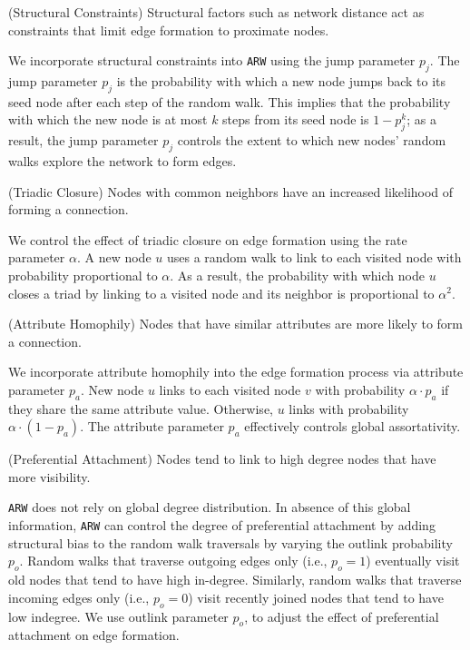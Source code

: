 \begin{ph}
	(Structural Constraints) Structural factors such as network distance
	act as constraints that limit edge formation to proximate nodes.  \cite{35626}
\end{ph}

We incorporate structural constraints into \texttt{ARW} using the jump parameter $p_j$.
The jump parameter $p_j$ is the probability with which a new node jumps back to its seed node
after each step of the random walk. This implies that the probability with which the new node
is at most $k$ steps from its seed node is $1-p^k_j$; as a result, the jump parameter $p_j$
controls the extent to which new nodes' random walks explore the network to form edges.

\begin{ph}
	(Triadic Closure) Nodes with common neighbors have an
	increased likelihood of forming a connection. \cite{simmel1950sociology}
\end{ph}

We control the effect of triadic closure on edge formation using the
rate parameter $\alpha$. A new node $u$ uses a random walk to
link to each visited node with probability proportional to $\alpha$. As a
result, the probability with which node $u$ closes a triad by linking to
a visited node and its neighbor is proportional to $\alpha^2$.

\begin{ph}
	(Attribute Homophily) Nodes that have similar attributes are more likely
	to form a connection. \cite{mcpherson2001birds}
\end{ph}
We incorporate attribute homophily into the edge formation process via attribute parameter $p_a$. New node
$u$ links to each visited node $v$ with probability $\alpha \cdot p_a$ if they share
the same attribute value. Otherwise, $u$ links with probability $\alpha \cdot (1-p_a)$.
The attribute parameter $p_a$ effectively controls global assortativity.

\begin{ph}
	(Preferential Attachment) Nodes tend to link to high degree nodes that have more
	visibility. \cite{barabasi1999emergence}
\end{ph}
\texttt{ARW} does not rely on global degree distribution. In absence of this global information, \texttt{ARW} can control the degree of preferential attachment by adding structural bias to the random walk traversals by varying the outlink probability $p_o$. Random walks that traverse outgoing edges only (i.e., $p_o =1$) eventually visit old nodes that tend to have high in-degree. Similarly, random walks that traverse incoming edges only (i.e., $p_o=0$) visit recently joined nodes that tend to have low indegree. We use outlink parameter $p_o$, to adjust the effect of preferential attachment on edge formation.

